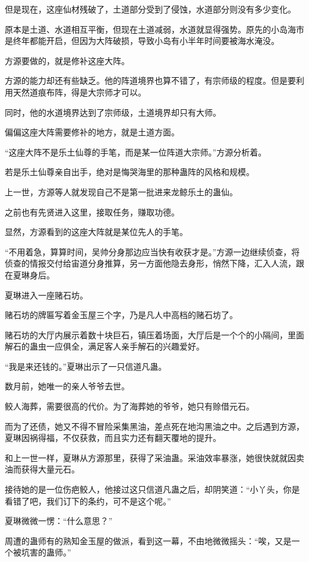 \begin{this_body}
但是现在，这座仙材残破了，土道部分受到了侵蚀，水道部分则没有多少变化。

原本是土道、水道相互平衡，但现在土道减弱，水道就显得强势。原先的小岛海市是终年都能开启，但因为大阵破损，导致小岛有小半年时间要被海水淹没。

方源要做的，就是修补这座大阵。

方源的能力却还有些缺乏。他的阵道境界也算不错了，有宗师级的程度。但是要利用天然道痕布阵，得是大宗师才可以。

同时，他的水道境界达到了宗师级，土道境界却只有大师。

偏偏这座大阵需要修补的地方，就是土道方面。

“这座大阵不是乐土仙尊的手笔，而是某一位阵道大宗师。”方源分析着。

若是乐土仙尊亲自出手，绝对是悔哭海里的那种蛊阵的风格和规模。

上一世，方源等人就发现自己不是第一批进来龙鲸乐土的蛊仙。

之前也有先贤进入这里，接取任务，赚取功德。

显然，方源看到的这座大阵就是某位先人的手笔。

“不用着急，算算时间，吴帅分身那边应当快有收获才是。”方源一边继续侦查，将侦查的情报交付给宙道分身推算，另一方面他隐去身形，悄然下降，汇入人流，跟在夏琳身后。

夏琳进入一座赌石坊。

赌石坊的牌匾写着金玉屋三个字，乃是凡人中高档的赌石坊了。

赌石坊的大厅内展示着数十块巨石，镇压着场面，大厅后是一个个的小隔间，里面解石的蛊虫一应俱全，满足客人亲手解石的兴趣爱好。

“我是来还钱的。”夏琳出示了一只信道凡蛊。

数月前，她唯一的亲人爷爷去世。

鲛人海葬，需要很高的代价。为了海葬她的爷爷，她只有赊借元石。

而为了还债，她又不得不冒险采集黑油，差点死在地沟黑油之中。之后遇到方源，夏琳因祸得福，不仅获救，而且实力还有翻天覆地的提升。

和上一世一样，夏琳从方源那里，获得了采油蛊。采油效率暴涨，她很快就就因卖油而获得大量元石。

接待她的是一位伤疤鲛人，他接过这只信道凡蛊之后，却阴笑道：“小丫头，你是看错了吧，我们订下的条约，可不是这个呢。”

夏琳微微一愣：“什么意思？”

周遭的蛊师有的熟知金玉屋的做派，看到这一幕，不由地微微摇头：“唉，又是一个被坑害的蛊师。”


\end{this_body}
